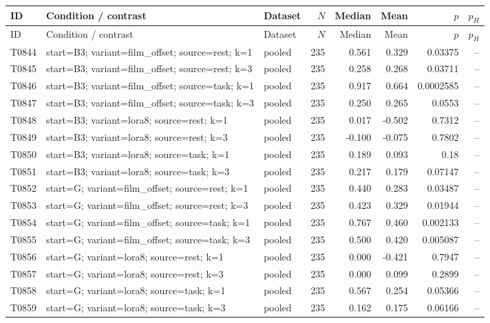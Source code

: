 \begin{longtable}{p{.45in}p{2.6in}p{.75in}rrrrr}
\toprule
ID & Condition / contrast & Dataset & $N$ & Median & Mean & $p$ & $p_H$ \\
\midrule
\endfirsthead
\toprule
ID & Condition / contrast & Dataset & $N$ & Median & Mean & $p$ & $p_H$ \\
\midrule
\endhead
T0844 & start=B3; variant=film\_\allowbreak{}offset; source=rest; k=1 & pooled & 235 & 0.561 & 0.329 & 0.03375 & -- \\
T0845 & start=B3; variant=film\_\allowbreak{}offset; source=rest; k=3 & pooled & 235 & 0.258 & 0.268 & 0.03711 & -- \\
T0846 & start=B3; variant=film\_\allowbreak{}offset; source=task; k=1 & pooled & 235 & 0.917 & 0.664 & 0.0002585 & -- \\
T0847 & start=B3; variant=film\_\allowbreak{}offset; source=task; k=3 & pooled & 235 & 0.250 & 0.265 & 0.0553 & -- \\
T0848 & start=B3; variant=lora8; source=rest; k=1 & pooled & 235 & 0.017 & -0.502 & 0.7312 & -- \\
T0849 & start=B3; variant=lora8; source=rest; k=3 & pooled & 235 & -0.100 & -0.075 & 0.7802 & -- \\
T0850 & start=B3; variant=lora8; source=task; k=1 & pooled & 235 & 0.189 & 0.093 & 0.18 & -- \\
T0851 & start=B3; variant=lora8; source=task; k=3 & pooled & 235 & 0.217 & 0.179 & 0.07147 & -- \\
T0852 & start=G; variant=film\_\allowbreak{}offset; source=rest; k=1 & pooled & 235 & 0.440 & 0.283 & 0.03487 & -- \\
T0853 & start=G; variant=film\_\allowbreak{}offset; source=rest; k=3 & pooled & 235 & 0.423 & 0.329 & 0.01944 & -- \\
T0854 & start=G; variant=film\_\allowbreak{}offset; source=task; k=1 & pooled & 235 & 0.767 & 0.460 & 0.002133 & -- \\
T0855 & start=G; variant=film\_\allowbreak{}offset; source=task; k=3 & pooled & 235 & 0.500 & 0.420 & 0.005087 & -- \\
T0856 & start=G; variant=lora8; source=rest; k=1 & pooled & 235 & 0.000 & -0.421 & 0.7947 & -- \\
T0857 & start=G; variant=lora8; source=rest; k=3 & pooled & 235 & 0.000 & 0.099 & 0.2899 & -- \\
T0858 & start=G; variant=lora8; source=task; k=1 & pooled & 235 & 0.567 & 0.254 & 0.05366 & -- \\
T0859 & start=G; variant=lora8; source=task; k=3 & pooled & 235 & 0.162 & 0.175 & 0.06166 & -- \\
\bottomrule
\end{longtable}
